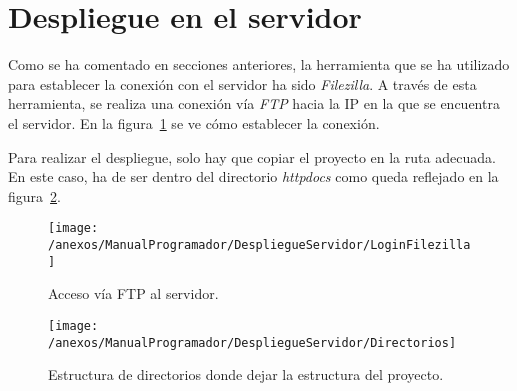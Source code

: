 \section{Despliegue en el servidor}

Como se ha comentado en secciones anteriores, la herramienta que se ha utilizado para establecer la conexión con el servidor ha sido \textit{Filezilla}. A través de esta herramienta, se realiza una conexión vía \textit{FTP} hacia la IP en la que se encuentra el servidor. En la figura~\ref{img:LoginFilezilla} se ve cómo establecer la conexión.

Para realizar el despliegue, solo hay que copiar el proyecto en la ruta adecuada. En este caso, ha de ser dentro del directorio \textit{httpdocs} como queda reflejado en la figura~\ref{img:Directorios}.

\begin{figure}[h]
	\centering
	\texttt{[image: /anexos/ManualProgramador/DespliegueServidor/LoginFilezilla]}
	\caption{Acceso vía FTP al servidor.}
	\label{img:LoginFilezilla}
\end{figure}

\begin{figure}[h]
	\centering
	\texttt{[image: /anexos/ManualProgramador/DespliegueServidor/Directorios]}
	\caption{Estructura de directorios donde dejar la estructura del proyecto.}
	\label{img:Directorios}
\end{figure}




